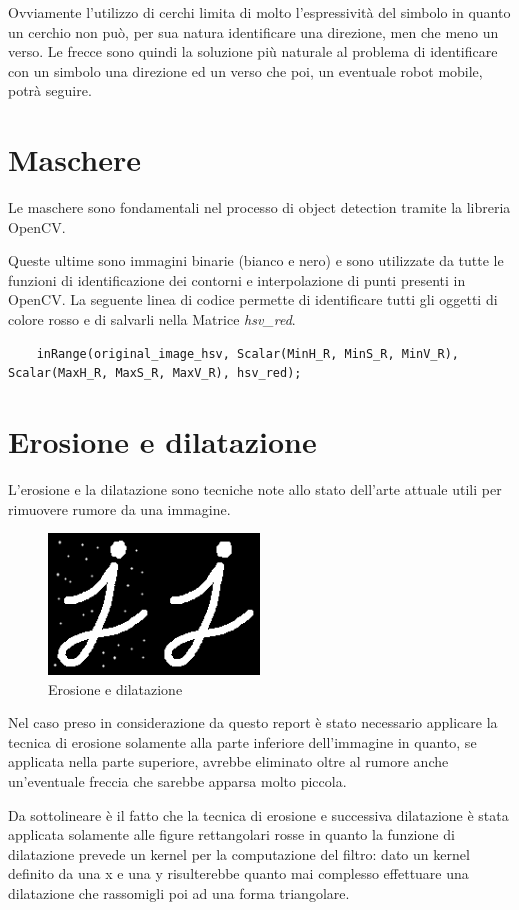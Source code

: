 Ovviamente l'utilizzo di cerchi limita di molto l'espressività del simbolo in quanto un cerchio non può, per sua natura identificare una direzione, men che meno un verso.
Le frecce sono quindi la soluzione più naturale al problema di identificare con un simbolo una direzione ed un verso che poi, un eventuale robot mobile, potrà seguire.


\section{Maschere}
Le maschere sono fondamentali nel processo di object detection tramite la libreria OpenCV.

Queste ultime sono immagini binarie (bianco e nero) e sono utilizzate da tutte le funzioni di identificazione dei contorni e interpolazione di punti presenti in OpenCV.
La seguente linea di codice permette di identificare tutti gli oggetti di colore rosso e di salvarli nella Matrice \textit{hsv\_red}.

\begin{lstlisting}
	inRange(original_image_hsv, Scalar(MinH_R, MinS_R, MinV_R), Scalar(MaxH_R, MaxS_R, MaxV_R), hsv_red);
\end{lstlisting}



\section{Erosione e dilatazione}
L'erosione e la dilatazione sono tecniche note allo stato dell'arte attuale utili per rimuovere rumore da una immagine.

\begin{figure}[H]
	\centering
	\includegraphics[width=0.5\textwidth]{Immagini/erosion_dil.png}
	\caption{Erosione e dilatazione}
	\label{fig:erosion_dil}
\end{figure}

Nel caso preso in considerazione da questo report è stato necessario applicare la tecnica di erosione solamente alla parte inferiore dell'immagine in quanto, se applicata nella parte superiore, avrebbe eliminato oltre al rumore anche un'eventuale freccia che sarebbe apparsa molto piccola.

Da sottolineare è il fatto che la tecnica di erosione e successiva dilatazione è stata applicata solamente alle figure rettangolari rosse in quanto la funzione di dilatazione prevede un kernel per la computazione del filtro: dato un kernel definito da una x e una y risulterebbe quanto mai complesso effettuare una dilatazione che rassomigli poi ad una forma triangolare.